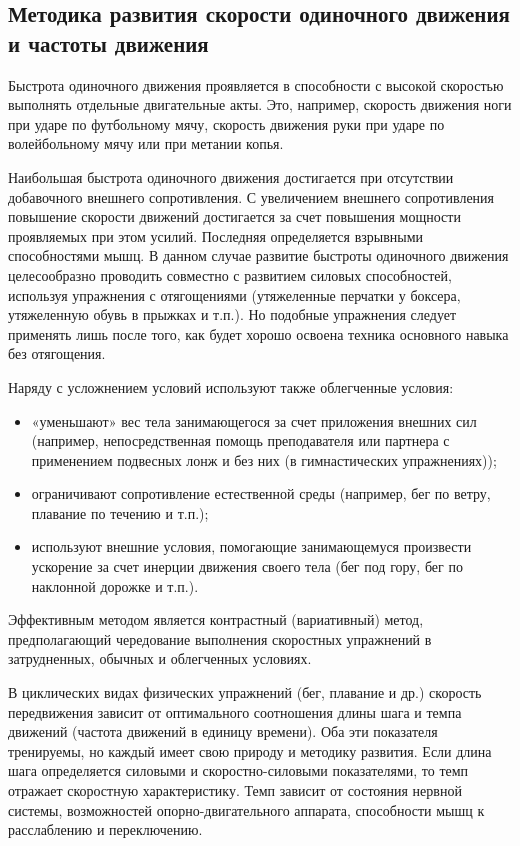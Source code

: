 \subsection*{Методика развития скорости одиночного движения и частоты движения}

Быстрота одиночного движения проявляется в способности с высокой скоростью выполнять отдельные двигательные акты.
Это, например, скорость движения ноги при ударе по футбольному мячу, скорость движения руки при ударе по волейбольному мячу или
при метании копья.

Наибольшая быстрота одиночного движения достигается при отсутствии добавочного внешнего сопротивления. С увеличением
внешнего сопротивления повышение скорости движений достигается за счет повышения мощности проявляемых при этом усилий.
Последняя определяется взрывными способностями мышц. В данном случае развитие быстроты одиночного движения целесообразно
проводить совместно с развитием силовых способностей, используя упражнения с отягощениями (утяжеленные перчатки у боксера,
утяжеленную обувь в прыжках и т.п.). Но подобные упражнения следует применять лишь после того, как будет хорошо освоена
техника основного навыка без отягощения.

Наряду с усложнением условий используют также облегченные условия:
\begin{itemize}
    \item «уменьшают» вес тела занимающегося за счет приложения внешних сил (например, непосредственная помощь
          преподавателя или партнера с применением подвесных лонж и без них (в гимнастических упражнениях));
    \item ограничивают сопротивление естественной среды (например, бег по ветру, плавание по течению и т.п.);
    \item используют внешние условия, помогающие занимающемуся произвести ускорение за счет инерции движения своего тела
          (бег под гору, бег по наклонной дорожке и т.п.).
\end{itemize}

Эффективным методом является контрастный (вариативный) метод, предполагающий чередование выполнения скоростных упражнений
в затрудненных, обычных и облегченных условиях.

В циклических видах физических упражнений (бег, плавание и др.) скорость передвижения зависит от оптимального соотношения
длины шага и темпа движений (частота движений в единицу времени). Оба эти показателя тренируемы, но каждый имеет свою природу и
методику развития. Если длина шага определяется силовыми и скоростно-силовыми показателями, то темп отражает скоростную
характеристику. Темп зависит от состояния нервной системы, возможностей опорно-двигательного аппарата, способности мышц к
расслаблению и переключению.

